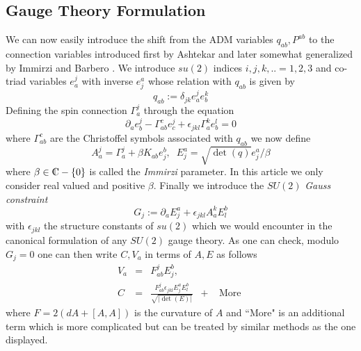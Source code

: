 \documentclass[12pt]{report}
\def\be{\begin{equation}}
\def\ee{\end{equation}}
\def\ba{\begin{eqnarray}}
\def\ea{\end{eqnarray}}
\def\Cl{{\mathchoice
{\setbox0=\hbox{$\displaystyle\rm C$}\hbox{\hbox to0pt
{\kern0.4\wd0\vrule height0.9\ht0\hss}\box0}}
{\setbox0=\hbox{$\textstyle\rm C$}\hbox{\hbox to0pt
{\kern0.4\wd0\vrule height0.9\ht0\hss}\box0}}
{\setbox0=\hbox{$\scriptstyle\rm C$}\hbox{\hbox to0pt
{\kern0.4\wd0\vrule height0.9\ht0\hss}\box0}}
{\setbox0=\hbox{$\scriptscriptstyle\rm C$}\hbox{\hbox to0pt
{\kern0.4\wd0\vrule height0.9\ht0\hss}\box0}}}}
\begin{document}
\subsection{Gauge Theory Formulation}
\label{s1.2.2}

We can now easily introduce the shift from the ADM variables 
$q_{ab},P^{ab}$ to the connection variables introduced first by Ashtekar
\cite{22} and later somewhat generalized by Immirzi \cite{23} and Barbero
\cite{24}.
We introduce $su(2)$ indices $i,j,k,..=1,2,3$ and co-triad variables $e_a^j$
with inverse $e^a_j$ whose relation with $q_{ab}$ is given by 
\be \label{1.2.12}
q_{ab}:=\delta_{jk} e^j_a e^k_b
\ee
Defining the spin connection $\Gamma_a^j$ through the equation
\be \label{1.2.13}
\partial_a e_b^j-\Gamma^c_{ab} e_c^j+\epsilon_{jkl} \Gamma_a^k e_b^l=0
\ee
where $\Gamma_{ab}^c$ are the Christoffel symbols associated with $q_{ab}$
we now define 
\be \label{1.2.14}
A_a^j=\Gamma_a^j+\beta K_{ab} e^b_j,\;\;E^a_j=\sqrt{\det(q)} e^a_j/\beta
\ee
where $\beta\in \Cl-\{0\}$ is called the {\it Immirzi} parameter.
In this article we only consider real valued and positive $\beta$.
Finally we introduce the $SU(2)$ {\it Gauss constraint}
\be \label{1.2.15}
G_j:=\partial_a E^a_j+\epsilon_{jkl} A_a^k E^b_l
\ee
with $\epsilon_{jkl}$ the structure constants of $su(2)$
which we would encounter in the canonical formulation of any $SU(2)$ 
gauge theory.
As one can check, modulo $G_j=0$ one can then write $C,V_a$ in terms of 
$A,E$ as follows 
\ba \label{1.2.16}
V_a &=& F_{ab}^j E^b_j, \nonumber\\
C &=& \frac{F_{ab}^j \epsilon_{jkl} E^a_j E^b_l}{\sqrt{|\det(E)|}}\;\;+\;\;
\mbox{ More }
\ea
where $F=2(dA+[A,A])$ is the curvature of $A$ and ``More" is an additional 
term which is more complicated but can be treated by similar methods as 
the one displayed.
 
\end{document}
